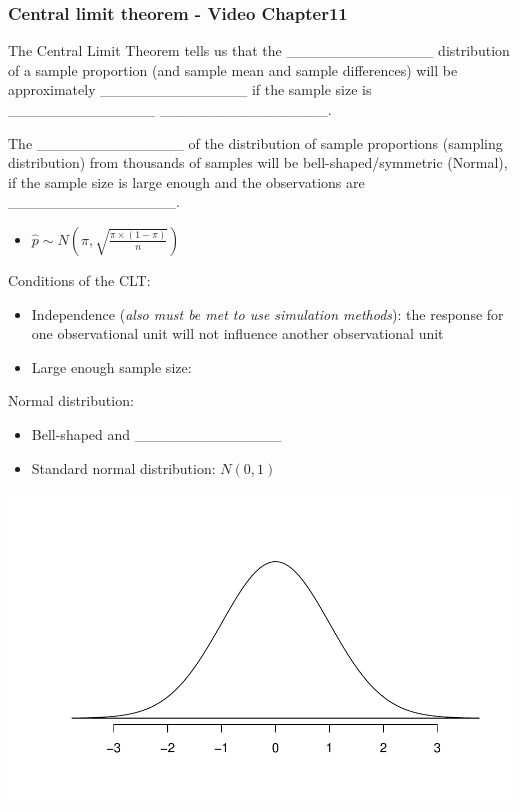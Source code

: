 \documentclass[
]{report}
\providecommand{\tightlist}{%
  \setlength{\itemsep}{0pt}\setlength{\parskip}{0pt}}
\begin{document}
\subsubsection*{Central limit theorem - Video Chapter11}\label{central-limit-theorem---video-chapter11}

The Central Limit Theorem tells us that the \_\_\_\_\_\_\_\_\_\_\_\_\_\_ distribution of a sample proportion (and sample mean and sample differences) will be approximately \_\_\_\_\_\_\_\_\_\_\_\_\_\_ if the sample size is \_\_\_\_\_\_\_\_\_\_\_\_\_\_ \_\_\_\_\_\_\_\_\_\_\_\_\_\_\_\_.

The \_\_\_\_\_\_\_\_\_\_\_\_\_\_ of the distribution of sample proportions (sampling distribution) from thousands of samples will be bell-shaped/symmetric (Normal), if the sample size is large enough and the observations are \_\_\_\_\_\_\_\_\_\_\_\_\_\_\_\_.

\begin{itemize}
\tightlist
\item
  \(\hat{p} \sim N (\pi, \sqrt{\frac{\pi \times (1-\pi)}{n}})\)
\end{itemize}

Conditions of the CLT:

\begin{itemize}
\tightlist
\item
  Independence (\emph{also must be met to use simulation methods}): the response for one observational unit will not influence another observational unit
\end{itemize}

\vspace{1mm}

\begin{itemize}
\tightlist
\item
  Large enough sample size:
\end{itemize}

\vspace{0.3in}

Normal distribution:

\begin{itemize}
\item
  Bell-shaped and \_\_\_\_\_\_\_\_\_\_\_\_\_\_
\item
  Standard normal distribution: \(N(0,1)\)
\end{itemize}

\begin{center}\includegraphics[width=0.45\linewidth]{04-VN04-1cat_theory_files/figure-latex/simpleNormalc-1} \end{center}
\end{document}
